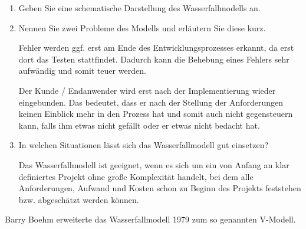 \documentclass{lehramt-informatik-minimal}
\begin{document}
\begin{enumerate}


\item Geben Sie eine schematische Darstellung des
Wasserfallmodells an.

\begin{antwort}
\end{antwort}


\item Nennen Sie zwei Probleme des Modells und erläutern Sie diese kurz.

\begin{antwort}
Fehler werden ggf. erst am Ende des Entwicklungsprozesses erkannt, da
erst dort das Testen stattfindet. Dadurch kann die Behebung eines
Fehlers sehr aufwändig und somit teuer werden.

Der Kunde / Endanwender wird erst nach der Implementierung wieder
eingebunden. Das bedeutet, dass er nach der Stellung der Anforderungen
keinen Einblick mehr in den Prozess hat und somit auch nicht
gegensteuern kann, falls ihm etwas nicht gefällt oder er etwas nicht
bedacht hat.
\end{antwort}


\item In welchen Situationen lässt sich das Wasserfallmodell gut
einsetzen?

\begin{antwort}
Das Wasserfallmodell ist geeignet, wenn es sich um ein von Anfang an
klar definiertes Projekt ohne große Komplexität handelt, bei dem alle
Anforderungen, Aufwand und Kosten schon zu Beginn des Projekts
feststehen bzw. abgeschätzt werden können.
\end{antwort}

\end{enumerate}

\noindent
Barry Boehm erweiterte das Wasserfallmodell 1979 zum so genannten
V-Modell.
\end{document}
